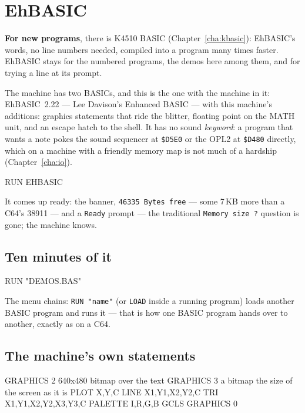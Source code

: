\chapter{EhBASIC}\label{cha:basic}

\noindent\textbf{For new programs}, there is K4510 BASIC
(Chapter~\ref{cha:kbasic}): EhBASIC's words, no line numbers needed,
compiled into a program many times faster. EhBASIC stays for the numbered
programs, the demos here among them, and for trying a line at its prompt.

The machine has two BASICs, and this is the one with the machine in it:
EhBASIC~2.22 --- Lee Davison's Enhanced BASIC --- with this machine's
additions: graphics statements that ride the blitter,
floating point on the MATH unit, and an escape hatch to the shell. It has
no sound \emph{keyword}: a program that wants a note poke\-s the sound
sequencer at \texttt{\$D5E0} or the OPL2 at \texttt{\$D480} directly,
which on a machine with a friendly memory map is not much of a hardship
(Chapter~\ref{cha:io}).

\begin{type}
RUN EHBASIC
\end{type}

It comes up ready: the banner, \texttt{46335 Bytes free} --- some
7\,KB more than a C64's 38911 --- and a
\verb|Ready| prompt --- the traditional \texttt{Memory size ?} question is
gone; the machine knows.

\section{Ten minutes of it}
\begin{type}
RUN "DEMOS.BAS"
\end{type}


The menu chains: \verb|RUN "name"| (or \verb|LOAD| inside a running
program) loads another BASIC program and runs it --- that is how one BASIC
program hands over to another, exactly as on a C64.

\section{The machine's own statements}
\begin{type}
GRAPHICS 2          640x480 bitmap over the text
GRAPHICS 3          a bitmap the size of the screen as it is
PLOT X,Y,C          LINE X1,Y1,X2,Y2,C
TRI X1,Y1,X2,Y2,X3,Y3,C
PALETTE I,R,G,B     GCLS            GRAPHICS 0
\end{type}

